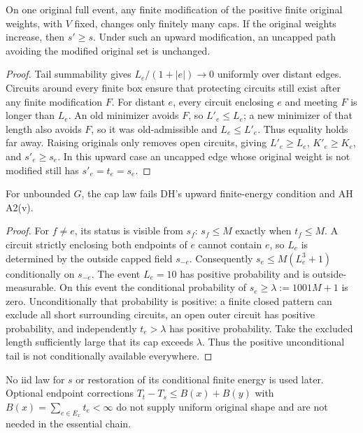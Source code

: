 \begin{lemma}\label{lem:influence}
On one original full event, any finite modification of the positive finite
original weights, with $V$ fixed, changes only finitely many caps. If the
original weights increase, then $s'\ge s$. Under such an upward modification,
an uncapped path avoiding the modified original set is unchanged.
\end{lemma}
\begin{proof}
Tail summability gives $L_e/(1+|e|)\to0$ uniformly over distant edges.
Circuits around every finite box ensure that protecting circuits still exist
after any finite modification $F$. For distant $e$, every circuit enclosing
$e$ and meeting $F$ is longer than $L_e$. An old minimizer avoids $F$, so
$L'_e\le L_e$; a new minimizer of that length also avoids $F$, so it was
old-admissible and $L_e\le L'_e$. Thus equality holds far away.
Raising originals only removes open circuits, giving $L'_e\ge L_e$,
$K'_e\ge K_e$, and $s'_e\ge s_e$. In this upward case an uncapped edge
whose original weight is not modified still has $s'_e=t_e=s_e$.
\end{proof}

\begin{proposition}\label{prop:energy}
For unbounded $G$, the cap law fails DH's upward finite-energy condition
and AH A2(v).
\end{proposition}
\begin{proof}
For $f\ne e$, its status is visible from $s_f$: $s_f\le M$ exactly when
$t_f\le M$. A circuit strictly enclosing both endpoints of $e$ cannot
contain $e$, so $L_e$ is determined by the outside capped field $s_{-e}$.
Consequently $s_e\le M(L_e^3+1)$ conditionally on $s_{-e}$. The event
$L_e=10$ has positive probability and is outside-measurable. On this event
the conditional probability of $s_e\ge\lambda:=1001M+1$ is zero.
Unconditionally that probability is positive: a finite closed pattern
can exclude all short surrounding circuits, an open outer circuit has
positive probability, and independently $t_e>\lambda$ has positive
probability. Take the excluded length sufficiently large that its cap
exceeds $\lambda$. Thus the positive unconditional tail is not conditionally
available everywhere.
\end{proof}
No iid law for $s$ or restoration of its conditional finite energy is used
later. Optional endpoint corrections $T_t-T_s\le B(x)+B(y)$ with
$B(x)=\sum_{e\in E_x}t_e<\infty$ do not supply uniform original shape and
are not needed in the essential chain.
